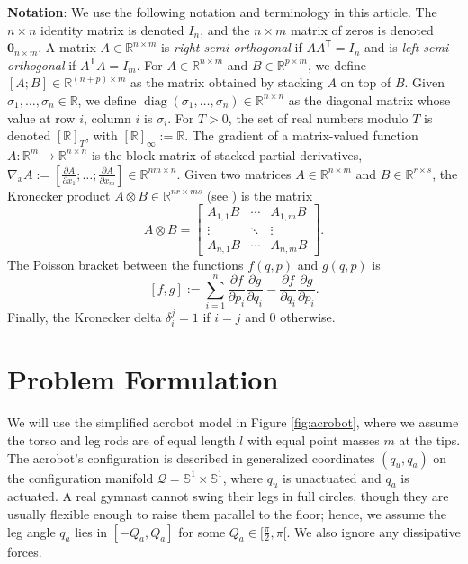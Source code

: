 \documentclass[journal,twoside,onecolumn,draftclsnofoot,web]{ieeecolor}
\DeclareMathOperator{\Diag}{diag}
\newcommand*{\diag}[1]{\Diag\left(#1\right)}
\newcommand*{\tpose}{^\mathsf{T}}
\newcommand*{\Rt}[1]{[\R]_{#1}}
\newcommand*{\R}{\mathbb{R}}
\newcommand*{\Sone}{\mathbb{S}^1}
\newcommand*{\Id}[1]{I_{#1}}
\newcommand*{\Zmat}[1]{\bm{0}_{#1}}
\newcommand*{\pdiff}[2]{\frac{\partial #1}{\partial #2}}
\begin{document}
\textbf{Notation}:
We use the following notation and terminology in this article.
The \(n \times n\) identity matrix is denoted \(\Id{n}\), and the \(n \times m\)
matrix of zeros is denoted \(\Zmat{n\times m}\).
A matrix \(A \in \R^{n \times m}\) is \textit{right semi-orthogonal} if
\(A A\tpose = \Id{n}\) and is \textit{left semi-orthogonal} if 
\(A\tpose A = \Id{m}\).
For \(A \in \R^{n\times m}\) and \(B \in \R^{p \times m}\),
we define \([A;B] \in \R^{(n+p)\times m}\) as the matrix obtained by stacking \(A\)
on top of \(B\). 
Given \(\sigma_1,\ldots,\sigma_n \in \R\), we define 
\(\diag{\sigma_1,\ldots,\sigma_n} \in \R^{n \times n}\) as the diagonal matrix
whose value at row \(i\), column \(i\) is \(\sigma_i\).
For \(T > 0\), the set of real numbers modulo \(T\) is denoted \(\Rt{T}\), with
\(\Rt{\infty} := \R\).
The gradient of a matrix-valued function 
\(A : \R^m \rightarrow \R^{n\times n}\) is the block matrix of stacked partial
derivatives, 
\(\nabla_xA := [\pdiff{A}{x_1};\ldots;\pdiff{A}{x_m}] \in \R^{nm \times n}\).
Given two matrices \(A \in \R^{n \times m}\) and \(B \in \R^{r \times s}\), the
Kronecker product \(A \otimes B \in \R^{nr \times ms}\) (see \cite{kronprod}) is
the matrix
\begin{equation}\label{eqn:kronprod}
    A \otimes B = \begin{bmatrix}
        A_{1,1}B & \cdots & A_{1,m} B \\
        \vdots & \ddots & \vdots \\
        A_{n,1} B & \cdots & A_{n,m} B
    \end{bmatrix} 
    .
\end{equation}
The Poisson bracket \cite{landau_mechanics} between the functions
\(f(q,p)\) and \(g(q,p)\) is
\begin{equation}\label{eqn:poisson-bracket}
    [f,g] := \sum \limits_{i=1}^n \pdiff{f}{p_i}\pdiff{g}{q_i} - 
        \pdiff{f}{q_i}\pdiff{g}{p_i}
    .
\end{equation}
Finally, the Kronecker delta \(\delta_i^j = 1\) if \(i = j\) and \(0\)
otherwise.

\section{Problem Formulation}\label{sec:problem-formulation}
We will use the simplified acrobot model in Figure
\ref{fig:acrobot}, where we assume the torso and leg rods are of
equal length \(l\) with equal point masses \(m\) at the tips.
The acrobot's configuration is described in generalized coordinates
\((q_u,q_a)\) on the configuration manifold 
\(\mathcal{Q} = \Sone \times \Sone\), where \(q_u\) is unactuated and 
\(q_a\) is actuated.
A real gymnast cannot swing their legs in full circles, though they
are usually flexible enough to raise them parallel to the floor;
hence, we assume the leg angle \(q_a\) lies in \([-Q_a, Q_a]\) for some
\(Q_a \in [\frac{\pi}{2}, \pi[\). 
We also ignore any dissipative forces.
\end{document}
